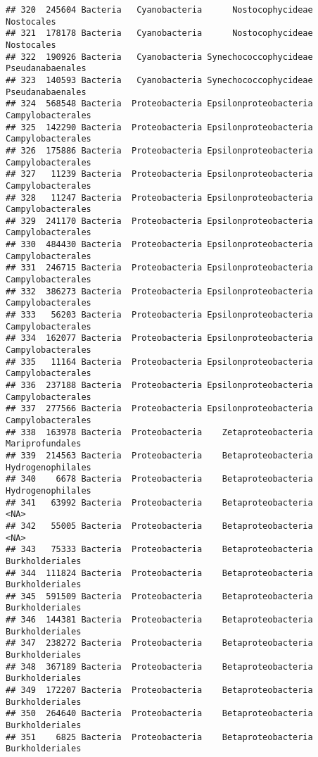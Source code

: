 \documentclass[
]{article}
\begin{document}
\begin{verbatim}
## 320  245604 Bacteria   Cyanobacteria      Nostocophycideae          Nostocales
## 321  178178 Bacteria   Cyanobacteria      Nostocophycideae          Nostocales
## 322  190926 Bacteria   Cyanobacteria Synechococcophycideae    Pseudanabaenales
## 323  140593 Bacteria   Cyanobacteria Synechococcophycideae    Pseudanabaenales
## 324  568548 Bacteria  Proteobacteria Epsilonproteobacteria   Campylobacterales
## 325  142290 Bacteria  Proteobacteria Epsilonproteobacteria   Campylobacterales
## 326  175886 Bacteria  Proteobacteria Epsilonproteobacteria   Campylobacterales
## 327   11239 Bacteria  Proteobacteria Epsilonproteobacteria   Campylobacterales
## 328   11247 Bacteria  Proteobacteria Epsilonproteobacteria   Campylobacterales
## 329  241170 Bacteria  Proteobacteria Epsilonproteobacteria   Campylobacterales
## 330  484430 Bacteria  Proteobacteria Epsilonproteobacteria   Campylobacterales
## 331  246715 Bacteria  Proteobacteria Epsilonproteobacteria   Campylobacterales
## 332  386273 Bacteria  Proteobacteria Epsilonproteobacteria   Campylobacterales
## 333   56203 Bacteria  Proteobacteria Epsilonproteobacteria   Campylobacterales
## 334  162077 Bacteria  Proteobacteria Epsilonproteobacteria   Campylobacterales
## 335   11164 Bacteria  Proteobacteria Epsilonproteobacteria   Campylobacterales
## 336  237188 Bacteria  Proteobacteria Epsilonproteobacteria   Campylobacterales
## 337  277566 Bacteria  Proteobacteria Epsilonproteobacteria   Campylobacterales
## 338  163978 Bacteria  Proteobacteria    Zetaproteobacteria     Mariprofundales
## 339  214563 Bacteria  Proteobacteria    Betaproteobacteria   Hydrogenophilales
## 340    6678 Bacteria  Proteobacteria    Betaproteobacteria   Hydrogenophilales
## 341   63992 Bacteria  Proteobacteria    Betaproteobacteria                <NA>
## 342   55005 Bacteria  Proteobacteria    Betaproteobacteria                <NA>
## 343   75333 Bacteria  Proteobacteria    Betaproteobacteria     Burkholderiales
## 344  111824 Bacteria  Proteobacteria    Betaproteobacteria     Burkholderiales
## 345  591509 Bacteria  Proteobacteria    Betaproteobacteria     Burkholderiales
## 346  144381 Bacteria  Proteobacteria    Betaproteobacteria     Burkholderiales
## 347  238272 Bacteria  Proteobacteria    Betaproteobacteria     Burkholderiales
## 348  367189 Bacteria  Proteobacteria    Betaproteobacteria     Burkholderiales
## 349  172207 Bacteria  Proteobacteria    Betaproteobacteria     Burkholderiales
## 350  264640 Bacteria  Proteobacteria    Betaproteobacteria     Burkholderiales
## 351    6825 Bacteria  Proteobacteria    Betaproteobacteria     Burkholderiales

\end{verbatim}
\end{document}
